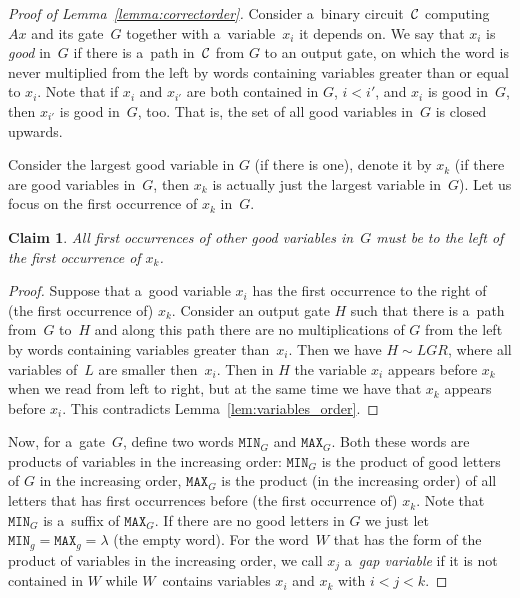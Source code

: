 \documentclass[11pt,letterpaper]{article}
\newtheorem{claim}{Claim}
\newcommand{\mmin}{\texttt{MIN}}
\newcommand{\mmax}{\texttt{MAX}}
\begin{document}

\begin{proof}[Proof of Lemma~\ref{lemma:correctorder}]
Consider a~binary circuit~${\cal C}$ computing~$Ax$ and its gate~$G$ together with a~variable~$x_i$ it depends on.
We say that $x_i$ is \emph{good} in~$G$ if there is
a~path in~${\cal C}$ from $G$ to an output gate, on which the word is never multiplied from the left by words containing variables greater than or equal to $x_i$.
Note that if $x_i$ and $x_{i'}$ are both contained in $G$, $i<i'$, and $x_i$ is good in~$G$, then $x_{i'}$ is good in~$G$, too. That is, the set of all good variables in~$G$ is closed upwards.

Consider the largest good variable in $G$ (if there is one), denote it by $x_k$ (if there are good variables in~$G$, then $x_k$ is actually just the largest variable in~$G${}). Let us focus on the first occurrence of $x_k$ in~$G$.

\begin{claim}
All first occurrences of other good variables in~$G$ must be to the left of the first occurrence of $x_k$.
\end{claim}

\begin{proof}
Suppose that a~good variable $x_i$ has the first occurrence to the right of (the first occurrence of) $x_k$. Consider an output gate $H$ such that there is a~path from~$G$ to~$H$ and along this path there are no multiplications of $G$ from the left by words containing variables greater than~$x_i$. Then we have $H \sim LGR$, where all variables of~$L$ are smaller then~$x_i$. Then in $H$ the variable $x_i$ appears before $x_k$ when we read from left to right, but at the same time we have that $x_k$ appears before $x_i$. This contradicts Lemma~\ref{lem:variables_order}.
\end{proof}

Now, for a~gate~$G$, define two words $\mmin_G$ and $\mmax_G$. Both these words are products of variables in the increasing order: $\mmin_G$ is the product of good letters of $G$ in the increasing order, $\mmax_G$ is the product (in the increasing order) of all letters that has first occurrences before (the first occurrence of) $x_k$. Note that $\mmin_G$ is
a~suffix of $\mmax_G$. If there are no good letters in $G$ we just let $\mmin_g=\mmax_g=\lambda$ (the empty word).
%
For the word~$W$ that has the form of the product of variables in the increasing order, we call $x_j$ a~\emph{gap variable} if it is not contained in $W$
while $W$~contains variables $x_i$ and $x_k$ with $i < j < k$.


\end{proof}
\end{document}
